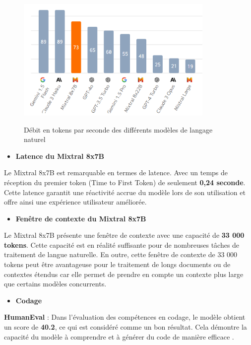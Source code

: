 \begin{figure}[H]
    \centering
    \includegraphics[width=0.85\textwidth,height=0.5\textwidth]{images/chp5/fig7.png}
    \caption{Débit en tokens par seconde des différents modèles de langage naturel} \cite{mixtral8x7b}
    \label{fig:Débit en tokens par seconde des différents modèles de langage naturel}    
\end{figure} 
\begin{itemize}
    \item \textbf{Latence du Mixtral 8x7B }
\end{itemize}
\noindent Le Mixtral 8x7B est remarquable en termes de latence. Avec un temps de réception du premier token (Time to First Token) de seulement \textbf{0,24 seconde}. Cette latence garantit une réactivité accrue du modèle lors de son utilisation et offre ainsi une expérience utilisateur améliorée.

\begin{itemize}
    \item \textbf{Fenêtre de contexte du Mixtral 8x7B }
\end{itemize}
\noindent Le Mixtral 8x7B présente une fenêtre de contexte avec une capacité de \textbf{33 000 tokens}. Cette capacité est en réalité suffisante pour de nombreuses tâches de traitement de langue naturelle. En outre, cette fenêtre de contexte de 33 000 tokens peut être avantageuse pour le traitement de longs documents ou de contextes étendus car elle permet de prendre en compte un contexte plus large que certains modèles concurrents.

\begin{itemize}
    \item \textbf{Codage }
\end{itemize}
\noindent \textbf{HumanEval} : Dans l'évaluation des compétences en codage, le modèle obtient un score de \textbf{40.2}, ce qui est considéré comme un bon résultat. Cela démontre la capacité du modèle à comprendre et à générer du code de manière efficace \cite{codage}.

